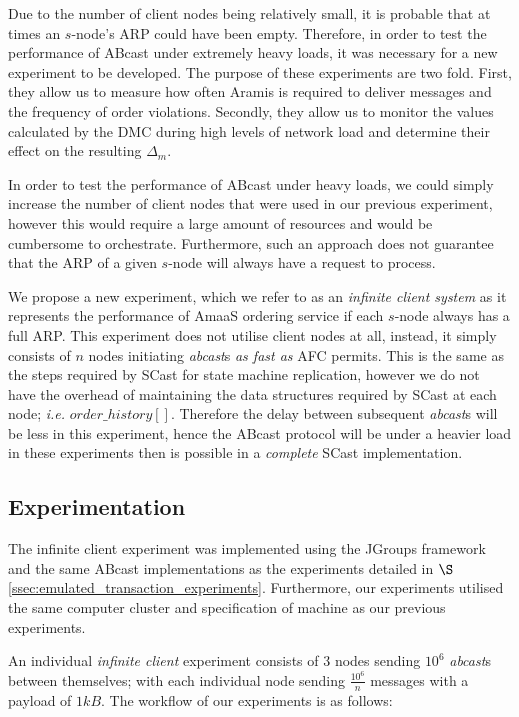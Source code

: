     Due to the number of client nodes being relatively small, it is probable that at times an $s$-node's ARP could have been empty.  Therefore, in order to test the performance of \textsf{ABcast} under extremely heavy loads, it was necessary for a new experiment to be developed.  The purpose of these experiments are two fold.  First, they allow us to measure how often \textsf{Aramis} is required to deliver messages and the frequency of order violations.  Secondly, they allow us to monitor the values calculated by the DMC during high levels of network load and determine their effect on the resulting $\Delta_m$.  
    
    In order to test the performance of \textsf{ABcast} under heavy loads, we could simply increase the number of client nodes that were used in our previous experiment, however this would require a large amount of resources and would be cumbersome to orchestrate.  Furthermore, such an approach does not guarantee that the ARP of a given $s$-node will always have a request to process.  
    
    We propose a new experiment, which we refer to  as an \emph{infinite client system} as it represents the performance of \textsf{AmaaS} ordering service if each $s$-node always has a full ARP.  This experiment does not utilise client nodes at all, instead, it simply consists of $n$ nodes initiating \emph{abcast}s \emph{as fast as} \textsf{AFC} permits.  This is the same as the steps required by \textsf{SCast} for state machine replication, however we do not have the overhead of maintaining the data structures required by \textsf{SCast} at each node; \emph{i.e.} $order\_history[]$.  Therefore the delay between subsequent \emph{abcast}s will be less in this experiment, hence the \textsf{ABcast} protocol will be under a heavier load in these experiments then is possible in a \emph{complete} \textsf{SCast} implementation. 
    
    \subsection{Experimentation}\label{ssec: infinite_experimentation}
    The infinite client experiment was implemented using the JGroups framework and the same \textsf{ABcast} implementations as the experiments detailed in $\S$ \ref{ssec:emulated_transaction_experiments}.  Furthermore, our experiments utilised the same computer cluster and specification of machine as our previous experiments.  
    
    An individual \emph{infinite client} experiment consists of $3$ nodes sending $10^6$ \emph{abcast}s between themselves; with each individual node sending $\frac{10^6}{n}$ messages with a payload of $1kB$.  The workflow of our experiments is as follows:
    
